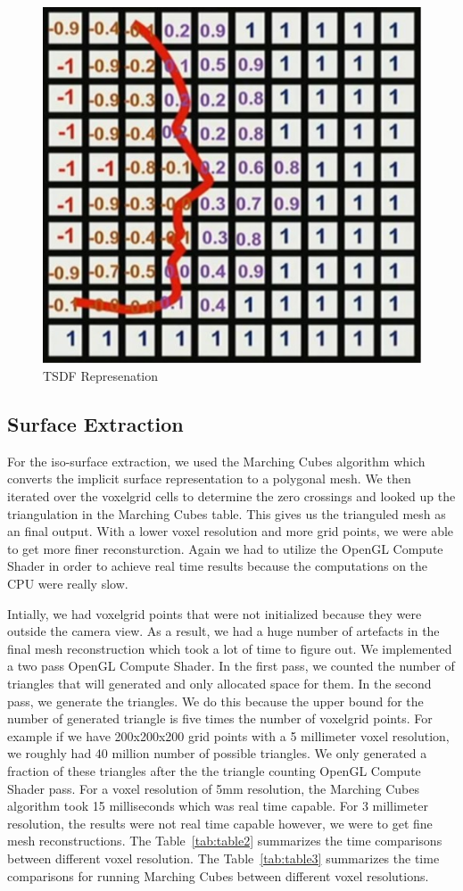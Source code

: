 \documentclass[10pt,twocolumn,letterpaper]{article}
\begin{document}
\begin{figure}[t]
\begin{center}
\includegraphics[width=0.6\linewidth]{imgs/tsdf}
\end{center}
 \caption{TSDF Represenation}
\end{figure}

\subsection{Surface Extraction}
For the iso-surface extraction, we used the Marching Cubes algorithm which converts the implicit surface representation to a polygonal mesh. We then iterated over the voxelgrid cells to determine the zero crossings and looked up the triangulation in the Marching Cubes table. This gives us the trianguled mesh as an final output. With a lower voxel resolution and more grid points, we were able to get more finer reconsturction. Again we had to utilize the OpenGL Compute Shader in order to achieve real time results because the computations on the CPU were really slow.

Intially, we had voxelgrid points that were not initialized because they were outside the camera view. As a result, we had a huge number of artefacts in the final mesh reconstruction which took a lot of time to figure out. We implemented a two pass OpenGL Compute Shader. In the first pass, we counted the number of triangles that will generated and only allocated space for them. In the second pass, we generate the triangles. We do this because the upper bound for the number of generated triangle is five times the number of voxelgrid points. For example if we have 200x200x200 grid points with a 5 millimeter voxel resolution, we roughly had 40 million number of possible triangles. We only generated a fraction of these triangles after the the triangle counting OpenGL Compute Shader pass. For a voxel resolution of 5mm resolution, the Marching Cubes algorithm took 15 milliseconds which was real time capable. For 3 millimeter resolution, the results were not real time capable however, we were to get fine mesh reconstructions.  The Table~\ref{tab:table2} summarizes the time comparisons between different voxel resolution. The Table~\ref{tab:table3} summarizes the time comparisons for running Marching Cubes between different voxel resolutions. 
\end{document}
